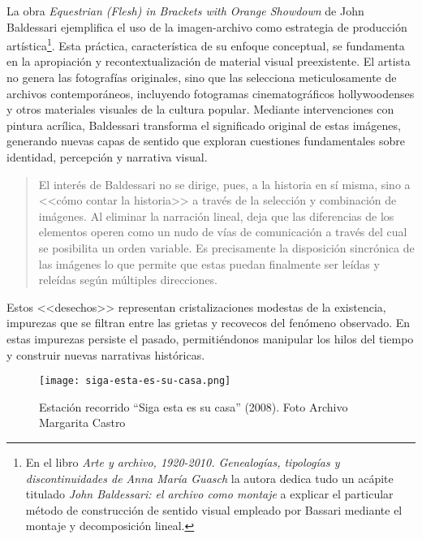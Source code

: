 La obra \textit{Equestrian (Flesh) in Brackets with Orange Showdown} de John Baldessari ejemplifica el uso de la imagen-archivo como estrategia de producción artística\footnote{En el libro \textit{Arte y archivo, 1920-2010. Genealogías, tipologías y discontinuidades de Anna María Guasch} la autora dedica tudo un acápite titulado \textit{John Baldessari: el archivo como montaje} a explicar el  particular método de construcción de sentido visual empleado por Bassari mediante el montaje y decomposición lineal.}. Esta práctica, característica de su enfoque conceptual, se fundamenta en la apropiación y recontextualización de material visual preexistente. El artista no genera las fotografías originales, sino que las selecciona meticulosamente de archivos contemporáneos, incluyendo fotogramas cinematográficos hollywoodenses y otros materiales visuales de la cultura popular. Mediante intervenciones con pintura acrílica, Baldessari transforma el significado original de estas imágenes, generando nuevas capas de sentido que exploran cuestiones fundamentales sobre identidad, percepción y narrativa visual.

\begin{quote}
    El interés de Baldessari no se dirige, pues, a la historia en sí misma, sino a <<cómo contar la historia>> a través de la selección y combinación de imágenes. Al eliminar la narración lineal, deja que las diferencias de los elementos operen como un nudo de vías de comunicación a través del cual se posibilita un orden variable. Es precisamente la disposición sincrónica de las imágenes lo que permite que estas puedan finalmente ser leídas y releídas según múltiples direcciones.\parencite[p. 113-114]{Guasch2011}
\end{quote}

Estos <<desechos>> representan cristalizaciones modestas de la existencia, impurezas que se filtran entre las grietas y recovecos del fenómeno observado. En estas impurezas persiste el pasado, permitiéndonos manipular los hilos del tiempo y construir nuevas narrativas históricas.

 
\begin{figure}[ht]
    \centering
    \texttt{[image: siga-esta-es-su-casa.png]}
    \caption{Estación recorrido ``Siga esta es su casa'' (2008). Foto Archivo Margarita Castro}
    \end{figure}
    
